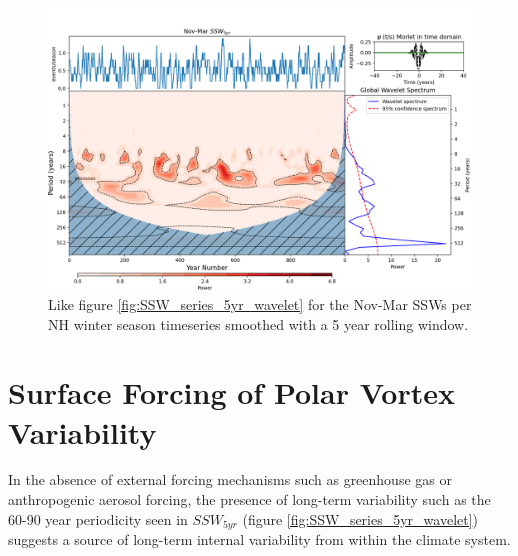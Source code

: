 \begin{figure}[h!]
\begin{center}
\noindent\includegraphics[width = 0.8\linewidth]{Figures/Figures-origins/SSW_wavelet_5_yr_NDJFM.png}
\caption[Wavelet power spectrum of Nov-Mar 5 year mean SSW time series in UKESM pi-control]{Like figure \ref{fig:SSW_series_5yr_wavelet} for the Nov-Mar SSWs per NH winter season timeseries smoothed with a 5 year rolling window.}
\label{fig:SSW_series_5yr_NDJFM_wavelet}
\end{center}
\end{figure}



\section{Surface Forcing of Polar Vortex Variability}
In the absence of external forcing mechanisms such as greenhouse gas or anthropogenic aerosol forcing, the presence of long-term variability such as the 60-90 year periodicity seen in $SSW_{5yr}$ (figure \ref{fig:SSW_series_5yr_wavelet}) suggests a source of long-term internal variability from within the climate system. 

